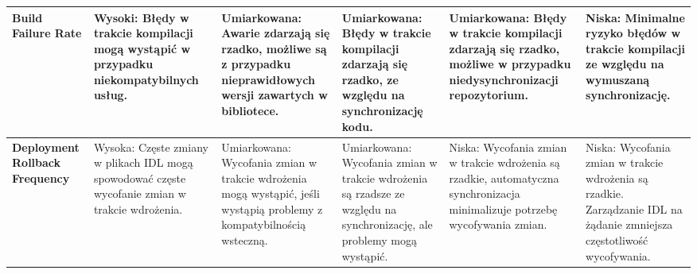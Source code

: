 \documentclass[runningheads,12pt]{llncs}
\begin{document}
\begin{table}[htbp]
\begin{tabularx}{\textwidth}{|>{\raggedright\arraybackslash}X|>{\raggedright\arraybackslash}X|>{\raggedright\arraybackslash}X|>{\raggedright\arraybackslash}X|>{\raggedright\arraybackslash}X|>{\raggedright\arraybackslash}X|}
    \hline
    \textbf{Build Failure Rate} &
    Wysoki: Błędy w trakcie kompilacji mogą wystąpić w przypadku niekompatybilnych usług. &
    Umiarkowana: Awarie zdarzają się rzadko, możliwe są z przypadku nieprawidłowych wersji zawartych w bibliotece. &
    Umiarkowana: Błędy w trakcie kompilacji zdarzają się rzadko, ze względu na synchronizację kodu. &
    Umiarkowana: Błędy w trakcie kompilacji zdarzają się rzadko, możliwe w przypadku niedysynchronizacji repozytorium. &
    Niska: Minimalne ryzyko błędów w trakcie kompilacji ze względu na wymuszaną synchronizację. \\
    \hline
    \textbf{Deployment Rollback Frequency} &
    Wysoka: Częste zmiany w plikach IDL mogą spowodować częste wycofanie zmian w trakcie wdrożenia. &
    Umiarkowana: Wycofania zmian w trakcie wdrożenia mogą wystąpić, jeśli wystąpią problemy z kompatybilnością wsteczną. &
    Umiarkowana: Wycofania zmian w trakcie wdrożenia są rzadsze ze względu na synchronizację, ale problemy mogą wystąpić. &
    Niska: Wycofania zmian w trakcie wdrożenia są rzadkie, automatyczna synchronizacja minimalizuje potrzebę wycofywania zmian. &
    Niska: Wycofania zmian w trakcie wdrożenia są rzadkie. Zarządzanie IDL na żądanie zmniejsza częstotliwość wycofywania. \\
    \hline
    \end{tabularx}
\end{table}

\newpage
\end{document}

